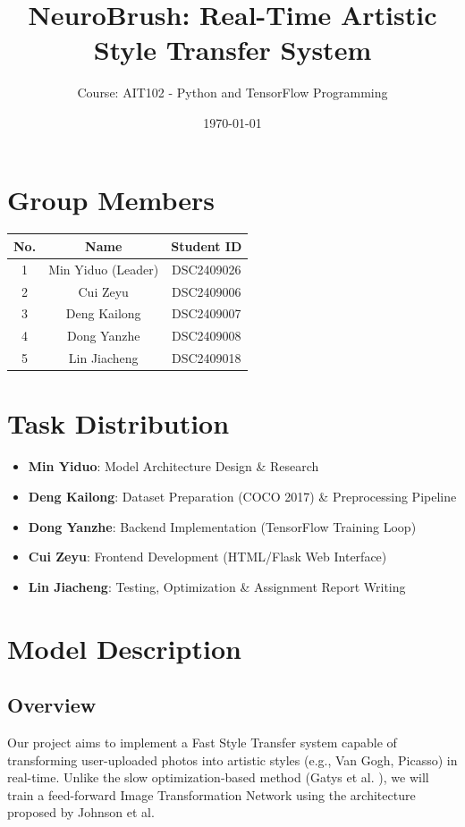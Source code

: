 \documentclass[a4paper,12pt]{article}
\title{\textbf{NeuroBrush: Real-Time Artistic Style Transfer System}}
\author{Course: AIT102 - Python and TensorFlow Programming}
\date{\today}
\begin{document}
\maketitle

\section{Group Members}
\begin{table}[h]
    \centering
    \begin{tabular}{|c|c|c|}
        \hline
        \textbf{No.} & \textbf{Name} & \textbf{Student ID} \\
        \hline
        1 & Min Yiduo (Leader) & DSC2409026 \\
        \hline
        2 & Cui Zeyu & DSC2409006 \\
        \hline
        3 & Deng Kailong & DSC2409007 \\
        \hline
        4 & Dong Yanzhe & DSC2409008 \\
        \hline
        5 & Lin Jiacheng & DSC2409018 \\
        \hline
    \end{tabular}
\end{table}

\section{Task Distribution}
\begin{itemize}
    \item \textbf{Min Yiduo}: Model Architecture Design \& Research
    \item \textbf{Deng Kailong}: Dataset Preparation (COCO 2017) \& Preprocessing Pipeline
    \item \textbf{Dong Yanzhe}: Backend Implementation (TensorFlow Training Loop)
    \item \textbf{Cui Zeyu}: Frontend Development (HTML/Flask Web Interface)
    \item \textbf{Lin Jiacheng}: Testing, Optimization \& Assignment Report Writing
\end{itemize}

\section{Model Description}

\subsection{Overview}
Our project aims to implement a Fast Style Transfer system capable of
transforming user-uploaded photos into artistic styles (e.g., Van Gogh, Picasso)
in real-time. Unlike the slow optimization-based method (Gatys et al.
\cite{gatys2015neural}), we will train a feed-forward Image Transformation
Network using the architecture proposed by Johnson et al.
\cite{johnson2016perceptual}
\end{document}
